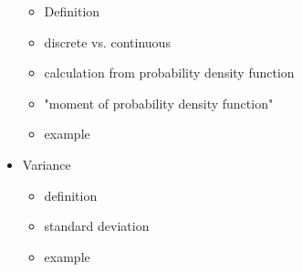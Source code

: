 \documentclass{article}
\begin{document}
\begin{itemize}
	\begin{itemize}
	\item Definition
	\item discrete vs. continuous
	\item calculation from probability density function
	\item "moment of probability density function"
	\item example
	\end{itemize}

\item Variance

	\begin{itemize}
	\item definition
	\item standard deviation
	\item example
	\end{itemize}

\end{itemize}
\end{document}
